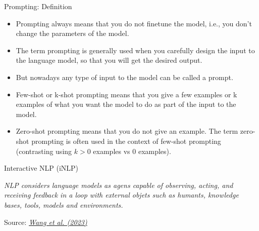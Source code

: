 \def\myblue#1{\textcolor{texblue}{#1}}

\begin{frame}{Prompting: Definition}

\vfill

\begin{itemize}

\item Prompting always means that you \myblue{do not finetune the model},
i.e., you don't change the parameters of the model.

\item The term prompting is generally used when you \myblue{carefully design the
input to the language model}, so that you will get the
desired output.

\item \myblue{But nowadays any type of input to the model can be called
a prompt.}

\item \myblue{Few-shot or k-shot prompting} means that you give a few
examples or k examples of what you want the model to do
as part of the input to the model.

\item \myblue{Zero-shot prompting} means that you do not give an example.
The term zero-shot prompting is often used in the context of
few-shot prompting (contrasting using $k>0$ examples vs 0
examples).

\end{itemize}

\vfill

\end{frame}

\endlecture





























\begin{vbframe}{Interactive NLP (\MakeLowercase{i}NLP)}

\vfill

\emph{NLP considers language models as agens capable of observing, acting, and receiving feedback in a loop with external objets such as humants, knowledge bases, tools, models and environments.} \vskip2mm

\footnotesize{Source:} \href{https://arxiv.org/pdf/2305.13246.pdf}{\footnotesize \it Wang et al. (2023)}

\vfill

\end{vbframe}

